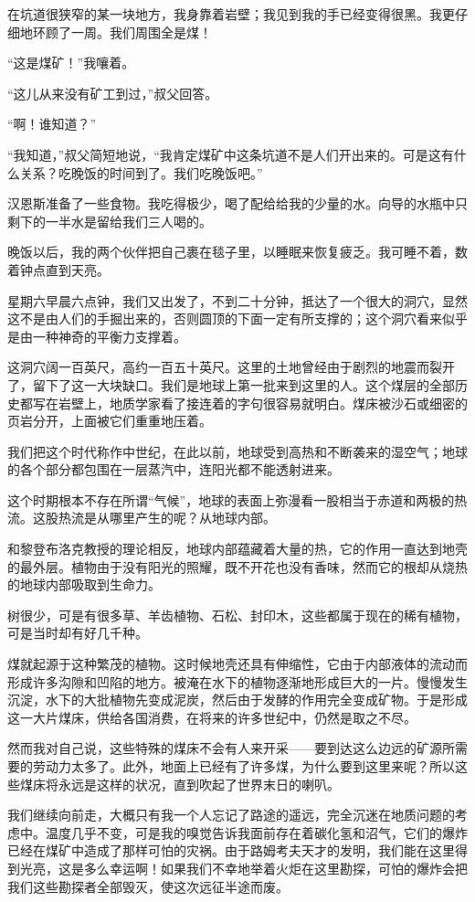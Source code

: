 \documentclass[10pt]{book}
\begin{document}
在坑道很狭窄的某一块地方，我身靠着岩壁；我见到我的手已经变得很黑。我更仔细地环顾了一周。我们周围全是煤！

“这是煤矿！”我嚷着。

“这儿从来没有矿工到过，”叔父回答。

“啊！谁知道？”

“我知道，”叔父简短地说，“我肯定煤矿中这条坑道不是人们开出来的。可是这有什么关系？吃晚饭的时间到了。我们吃晚饭吧。”

汉恩斯准备了一些食物。我吃得极少，喝了配给给我的少量的水。向导的水瓶中只剩下的一半水是留给我们三人喝的。

晚饭以后，我的两个伙伴把自己裹在毯子里，以睡眠来恢复疲乏。我可睡不着，数着钟点直到天亮。

星期六早晨六点钟，我们又出发了，不到二十分钟，抵达了一个很大的洞穴，显然这不是由人们的手掘出来的，否则圆顶的下面一定有所支撑的；这个洞穴看来似乎是由一种神奇的平衡力支撑着。

这洞穴阔一百英尺，高约一百五十英尺。这里的土地曾经由于剧烈的地震而裂开了，留下了这一大块缺口。我们是地球上第一批来到这里的人。这个煤层的全部历史都写在岩壁上，地质学家看了接连着的字句很容易就明白。煤床被沙石或细密的页岩分开，上面被它们重重地压着。

我们把这个时代称作中世纪，在此以前，地球受到高热和不断袭来的湿空气；地球的各个部分都包围在一层蒸汽中，连阳光都不能透射进来。

这个时期根本不存在所谓“气候”，地球的表面上弥漫看一股相当于赤道和两极的热流。这股热流是从哪里产生的呢？从地球内部。

和黎登布洛克教授的理论相反，地球内部蕴藏着大量的热，它的作用一直达到地壳的最外层。植物由于没有阳光的照耀，既不开花也没有香味，然而它的根却从烧热的地球内部吸取到生命力。

树很少，可是有很多草、羊齿植物、石松、封印木，这些都属于现在的稀有植物，可是当时却有好几千种。

煤就起源于这种繁茂的植物。这时候地壳还具有伸缩性，它由于内部液体的流动而形成许多沟隙和凹陷的地方。被淹在水下的植物逐渐地形成巨大的一片。慢慢发生沉淀，水下的大批植物先变成泥炭，然后由于发酵的作用完全变成矿物。于是形成这一大片煤床，供给各国消费，在将来的许多世纪中，仍然是取之不尽。

然而我对自己说，这些特殊的煤床不会有人来开采——要到达这么边远的矿源所需要的劳动力太多了。此外，地面上已经有了许多煤，为什么要到这里来呢？所以这些煤床将永远是这样的状况，直到吹起了世界末日的喇叭。

我们继续向前走，大概只有我一个人忘记了路途的遥远，完全沉迷在地质问题的考虑中。温度几乎不变，可是我的嗅觉告诉我面前存在着碳化氢和沼气，它们的爆炸已经在煤矿中造成了那样可怕的灾祸。由于路姆考夫天才的发明，我们能在这里得到光亮，这是多么幸运啊！如果我们不幸地举着火炬在这里勘探，可怕的爆炸会把我们这些勘探者全部毁灭，使这次远征半途而废。
\end{document}
